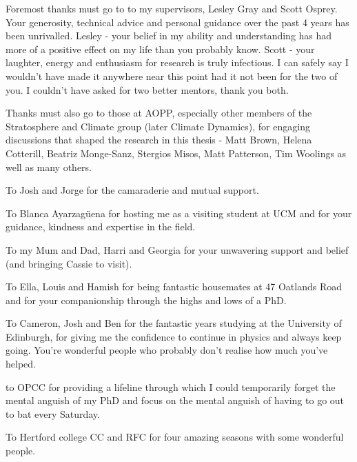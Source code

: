 \begin{acknowledgements}

Foremost thanks must go to to my supervisors, Lesley Gray and Scott Osprey. Your generosity, technical advice and personal guidance over the past 4 years has been unrivalled. Lesley - your belief in my ability and understanding has had more of a positive effect on my life than you probably know. Scott - your laughter, energy and enthusiasm for research is truly infectious. I can safely say I wouldn't have made it anywhere near this point had it not been for the two of you. I couldn't have asked for two better mentors, thank you both.

Thanks must also go to those at AOPP, especially other members of the Stratosphere and Climate group (later Climate Dynamics), for engaging discussions that shaped the research in this thesis - Matt Brown, Helena Cotterill, Beatriz Monge-Sanz, Stergios Misos, Matt Patterson, Tim Woolings as well as many others. 

To Josh and Jorge for the camaraderie and mutual support.

To Blanca Ayarzagüena for hosting me as a visiting student at UCM and for your guidance, kindness and expertise in the field. 

To my Mum and Dad, Harri and Georgia for your unwavering support and belief (and bringing Cassie to visit).

To Ella, Louis and Hamish for being fantastic housemates at 47 Oatlands Road and for your companionship through the highs and lows of a PhD.

To Cameron, Josh and Ben for the fantastic years studying at the University of Edinburgh, for giving me the confidence to continue in physics and always keep going. You're wonderful people who probably don't realise how much you've helped.

to OPCC for providing a lifeline through which I could temporarily forget the mental anguish of my PhD and focus on the mental anguish of having to go out to bat every Saturday. 

To Hertford college CC and RFC for four amazing seasons with some wonderful people. %
\end{acknowledgements}




